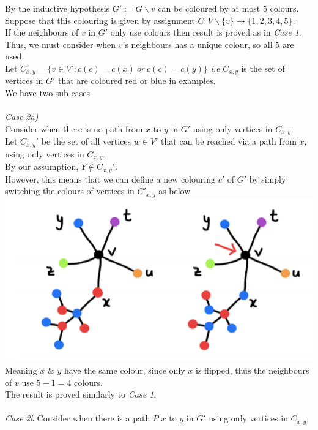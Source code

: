 \documentclass[11pt,a4paper]{article}
\begin{document}
By the inductive hypothesis $G':=G\backslash v$ can be coloured by at most $5$ colours.\\
Suppose that this colouring is given by assignment $C:V\backslash\{v\}\to\{1,2,3,4,5\}$.\\
If the neighbours of $v$ in $G'$ only use colours then result is proved as in \textit{Case 1}.\\
Thus, we must consider when $v$'s neighbours has a unique colour, so all $5$ are used.\\
Let $C_{x,y}=\{v\in V':c(c)=c(x)\ or\ c(c)=c(y)\}$ \textit{i.e} $C_{x,y}$ is the set of vertices in $G'$ that are coloured red or blue in examples.\\
We have two sub-cases\\
\\
\textit{Case 2a)}\\
Consider when there is no path from $x$ to $y$ in $G'$ using only vertices in $C_{x,y}$.\\
Let $C_{x,y}'$ be the set of all vertices $w\in V'$ that can be reached via a path from $x$, using only vertices in $C_{x,y}$.\\
By our assumption, $Y\not\in C_{x,y}'$.\\
However, this means that we can define a new colouring $c'$ of $G'$ by simply switching the colours of vertices in $C'_{x,y}$ as below\\
\includegraphics[scale=0.5]{img/5proof2.png}\\
Meaning $x$ \& $y$ have the same colour, since only $x$ is flipped, thus the neighbours of $v$ use $5-1=4$ colours.\\
The result is proved similarly to \textit{Case 1}.\\
\\
\textit{Case 2b}
Consider when there is a path $P$ $x$ to $y$ in $G'$ using only vertices in $C_{x,y}$.\\
\end{document}
